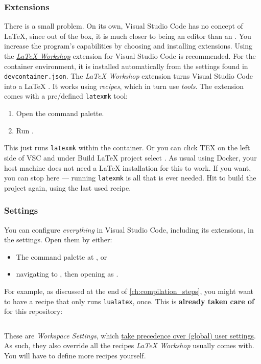 \subsubsection{Extensions}
There is a small problem.
On its own, Visual Studio Code has no concept of \LaTeX{}, since out of the box, it is much closer to being an editor than an .
You increase the program's capabilities by choosing and installing extensions.
Using the \href{https://marketplace.visualstudio.com/items?itemName=James-Yu.latex-workshop}{\emph{LaTeX Workshop}} extension for Visual Studio Code is recommended.
For the container environment, it is installed automatically from the settings found in \texttt{devcontainer.json}.
The \emph{LaTeX Workshop} extension turns Visual Studio Code into a \LaTeX{} .
It works using \emph{recipes}, which in turn use \emph{tools}.
The extension comes with a pre\-/defined \texttt{latexmk} tool:
\begin{enumerate}
  \item Open the command palette.
  \item Run .
\end{enumerate}
This just runs \texttt{latexmk} within the container. Or you can click TEX on the left side of VSC and under Build LaTeX project select .
As usual using Docker, your host machine does not need a \LaTeX{} installation for this to work.
If you want, you can stop here --- running \texttt{latexmk} is all that is ever needed.
Hit  to build the project again, using the last used recipe.

\subsubsection{Settings}
You can configure \emph{everything} in Visual Studio Code, including its extensions, in the settings.
Open them by either:
\begin{itemize}
  \item The command palette at , or
  \item navigating to , then opening as .
\end{itemize}
For example, as discussed at the end of \cref{ch:compilation_steps}, you might want to have a recipe that only runs \texttt{lualatex}, once.
This is \textbf{already taken care of} for this repository:
\inputminted{json}{./.vscode/settings.json}
These are \emph{Workspace Settings}, which \href{https://code.visualstudio.com/docs/getstarted/settings}{take precedence over (global) user settings}.
As such, they also override all the recipes \emph{LaTeX Workshop} usually comes with.
You will have to define more recipes yourself.


